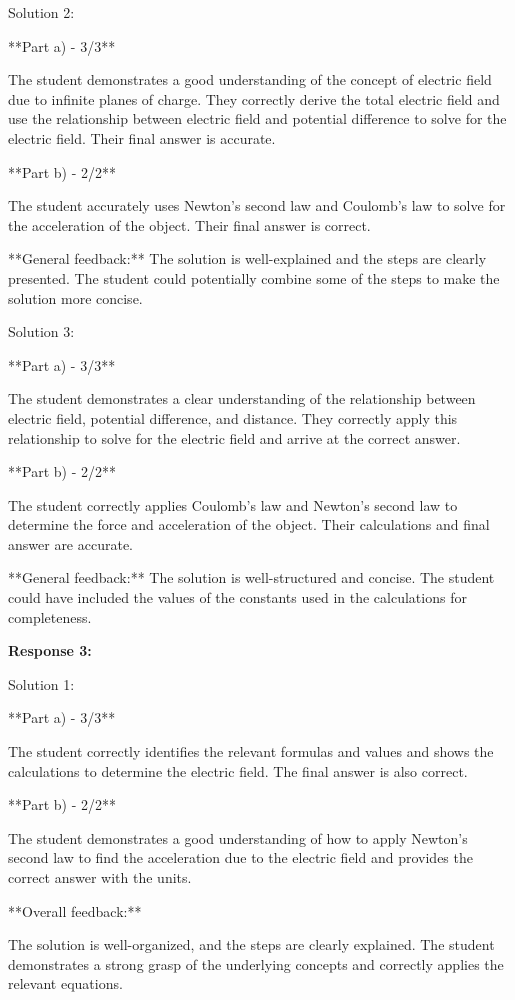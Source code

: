 \documentclass[a4paper,11pt]{article}
\begin{document}
Solution 2:

**Part a) - 3/3**

The student demonstrates a good understanding of the concept of electric field due to infinite planes of charge. They correctly derive the total electric field and use the relationship between electric field and potential difference to solve for the electric field. Their final answer is accurate.

**Part b) - 2/2**

The student accurately uses Newton's second law and Coulomb's law to solve for the acceleration of the object. Their final answer is correct.

**General feedback:** The solution is well-explained and the steps are clearly presented. The student could potentially combine some of the steps to make the solution more concise.

Solution 3:

**Part a) - 3/3**

The student demonstrates a clear understanding of the relationship between electric field, potential difference, and distance. They correctly apply this relationship to solve for the electric field and arrive at the correct answer.

**Part b) - 2/2**

The student correctly applies Coulomb's law and Newton's second law to determine the force and acceleration of the object. Their calculations and final answer are accurate.

**General feedback:** The solution is well-structured and concise. The student could have included the values of the constants used in the calculations for completeness.

\bigskip    
\textbf{Response 3:}

Solution 1:

**Part a) - 3/3**

The student correctly identifies the relevant formulas and values and shows the calculations to determine the electric field. The final answer is also correct.

**Part b) - 2/2**

The student demonstrates a good understanding of how to apply Newton's second law to find the acceleration due to the electric field and provides the correct answer with the units.

**Overall feedback:**

The solution is well-organized, and the steps are clearly explained. The student demonstrates a strong grasp of the underlying concepts and correctly applies the relevant equations.
\end{document}

